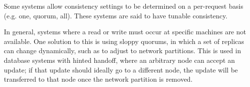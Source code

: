 \documentclass[12pt,titlepage]{article}
\begin{document}
      Some systems allow consistency settings to be determined on a per-request basis (e.g. one, quorum, all). These systems are said to have tunable consistency.

      In general, systems where a read or write must occur at specific machines are not available. One solution to this is using sloppy quorums, in which a set
      of replicas can change dynamically, such as to adjust to network partitions. This is used in database systems with hinted handoff, where an arbitrary node
      can accept an update; if that update should ideally go to a different node, the update will be transferred to that node once the network partition is removed.
\end{document}
